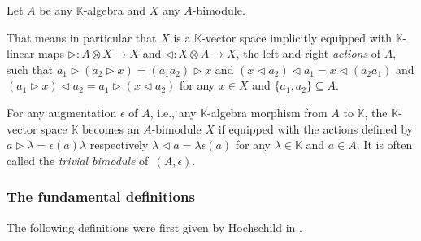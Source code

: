 \documentclass[10pt,a4paper]{amsart}
\numberwithin{equation}{section}
\newcommand{\Scounit}{\epsilon}
\newcommand{\Smonoidalproduct}{\otimes}
\newcommand{\xfromto}[3]{#1 \colon  #2 \to #3}
\newcommand{\Sleftmoduleaction}{\triangleright}
\newcommand{\Srightmoduleaction}{\triangleleft}
\newcommand{\thefield}{\mathbb{K}}
\newcommand{\themodule}{X}
\newcommand{\thecounit}{\Scounit}
\begin{document}
{
  \newcommand{\thealgebra}{A}
\begin{Assumptions}
  Let $\thealgebra$ be any $\thefield$-algebra and $\themodule$ any $\thealgebra$-bimodule.
\end{Assumptions}
{
  \newcommand{\firstop}{a_1}
  \newcommand{\secondop}{a_2}
  \newcommand{\anyvector}{x}
That means in particular that $\themodule$ is a $\thefield$-vector space implicitly equipped with $\thefield$-linear maps  $\xfromto{\Sleftmoduleaction}{\thealgebra\Smonoidalproduct\themodule}{\themodule}$ and $\xfromto{\Srightmoduleaction}{\themodule\Smonoidalproduct\thealgebra}{\themodule}$, the left and right \emph{actions} of $\thealgebra$,  such that $\firstop\Sleftmoduleaction(\secondop\Sleftmoduleaction\anyvector)=(\firstop\secondop)\Sleftmoduleaction\anyvector$ and $(\anyvector\Srightmoduleaction\secondop)\Srightmoduleaction\firstop=\anyvector\Srightmoduleaction(\secondop\firstop)$ and $(\firstop\Sleftmoduleaction \anyvector)\Srightmoduleaction\secondop=\firstop\Sleftmoduleaction( \anyvector\Srightmoduleaction\secondop)$ for any $\anyvector\in\themodule$ and $\{\firstop,\secondop\}\subseteq \thealgebra$.
}
\begin{Example}
  \label{example:trivial_bimodule}
  \newcommand{\anyscalar}{\lambda}
  \newcommand{\anyop}{a}
    For any augmentation $\thecounit$ of $\thealgebra$, i.e., any $\thefield$-algebra morphism from $\thealgebra$ to $\thefield$, the $\thefield$-vector space $\thefield$ becomes an $\thealgebra$-bimodule $\themodule$ if equipped with the
    actions defined by $\anyop\Sleftmoduleaction\anyscalar= \thecounit(\anyop)\anyscalar$ respectively $\anyscalar\Srightmoduleaction\anyop= \anyscalar\thecounit(\anyop)$ for any $\anyscalar\in\thefield$ and $\anyop\in \thealgebra$. It is often called the \emph{trivial bimodule} of~$(\thealgebra,\thecounit)$.
\end{Example}
\subsubsection{The fundamental definitions}
\label{section:hochschild-general-definitions}
The following definitions were first given by Hochschild in \cite{Hochschild1956}.

}
\end{document}
